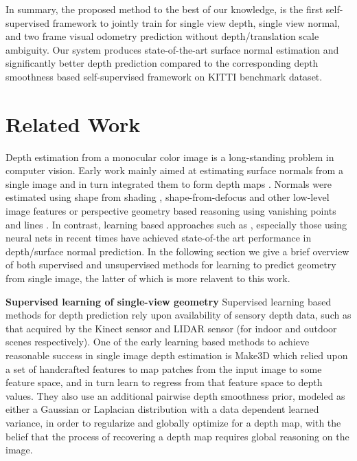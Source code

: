 \documentclass[letterpaper, 10 pt, conference]{ieeeconf}
\begin{document}
In summary, the proposed method to the best of our knowledge, is the first self-supervised framework to jointly train for single view depth, single view normal, and two frame visual odometry prediction without depth/translation scale ambiguity.
Our system produces state-of-the-art surface normal estimation and significantly better depth prediction compared to the corresponding depth smoothness based self-supervised framework on KITTI benchmark dataset.













\section{Related Work} \label{Sec:rel_work}

 Depth estimation from a monocular color image is a long-standing problem in computer vision. Early work mainly aimed at estimating surface normals from a single image and in turn integrated them to form depth maps \cite{NormalIntegrationSurvey}. Normals were estimated using shape from shading \cite{Zhang99shapefrom}, shape-from-defocus \cite{suwajanakorn2015depth} and other low-level image features \cite{hoiem2005automatic,hoiem2007recovering} or perspective geometry based reasoning using vanishing points and lines \cite{criminisi1999single}. In contrast, learning based approaches such as \cite{2014discriminativelyladicky, fouhey2013data}, especially those using neural nets \cite{eigen2015predicting, Wang15, bansal2016marr, bansal2016pixelnet} in recent times have achieved state-of-the art performance in depth/surface normal prediction. In the following section we give a brief overview of both supervised and unsupervised methods for learning to predict geometry from single image, the latter of which is more relavent to this work. 
 
\textbf{Supervised learning of single-view geometry}
Supervised learning based methods for depth prediction rely upon availability of sensory depth data, such as that acquired by the Kinect sensor and LIDAR sensor (for indoor and outdoor scenes respectively). One of the early learning based methods to achieve reasonable success in single image depth estimation is Make3D \cite{saxena2006learning,saxena2009make3d} which relied upon a set of handcrafted features to map patches from the input image to some feature space, and in turn learn to regress from that feature space to depth values. They also use an additional pairwise depth smoothness prior, modeled as either a Gaussian or Laplacian distribution with a data dependent learned variance, in order to regularize and globally optimize for a depth map, with the belief that the process of recovering a depth map requires global reasoning on the image. 
\end{document}
